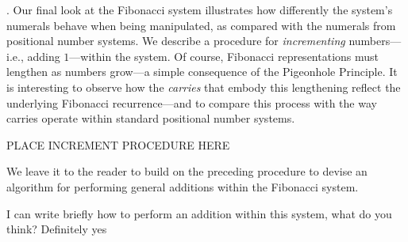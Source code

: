 \bigskip

.
Our final look at the Fibonacci system illustrates how differently the system's numerals behave  when being manipulated, as compared with the numerals from positional number systems.  We describe a procedure for {\em incrementing} numbers---i.e., adding $1$---within the system.  Of course, Fibonacci representations must lengthen as numbers grow---a simple consequence of the Pigeonhole Principle.  It is interesting to observe how the {\em carries} that embody this lengthening reflect the underlying Fibonacci recurrence---and to compare this process with the way carries operate within standard positional number systems.


PLACE INCREMENT PROCEDURE HERE

We leave it to the reader to build on the preceding procedure to devise an algorithm for performing general additions within the Fibonacci system.

{\Denis I can write briefly how to perform an addition within this system, what do you think?}
{\Arny Definitely yes}

